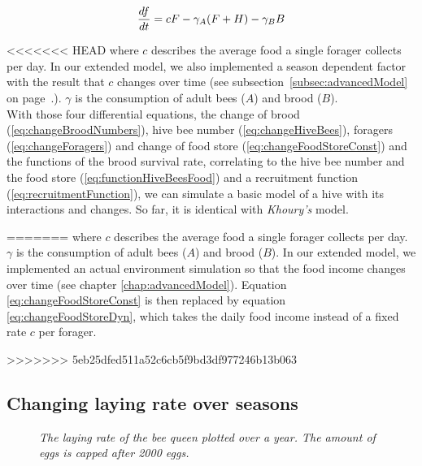 	\begin{equation}\label{eq:changeFoodStoreConst}
		{df \over dt} = c F - \gamma_A (F+H) - \gamma_B B
	\end{equation}
         
<<<<<<< HEAD
	where $c$ describes the average food a single forager collects per day. In our extended model, we also implemented a season dependent factor with the result that $c$ changes over time (see subsection~\ref{subsec:advancedModel} on page~\pageref{subsec:advancedModel}.). $\gamma$ is the consumption of adult bees ($A$) and brood ($B$).\\
	With those four differential equations, the change of brood (\ref{eq:changeBroodNumbers}), hive bee number (\ref{eq:changeHiveBees}), foragers (\ref{eq:changeForagers}) and change of food store (\ref{eq:changeFoodStoreConst}) and the functions of the brood survival rate, correlating to the hive bee number and the food store (\ref{eq:functionHiveBeesFood}) and a recruitment function (\ref{eq:recruitmentFunction}), we can simulate a basic model of a hive with its interactions and changes. So far, it is identical with \textit{Khoury's} model.
	
=======
	where $c$ describes the average food a single forager collects per day. $\gamma$ is the consumption of adult bees ($A$) and brood ($B$). In our extended model, we implemented an actual environment simulation so that the food income changes over time (see chapter \ref{chap:advancedModel}). Equation \ref{eq:changeFoodStoreConst} is then replaced by equation \ref{eq:changeFoodStoreDyn}, which takes the daily food income instead of a fixed rate $c$ per forager.

>>>>>>> 5eb25dfed511a52c6cb5f9bd3df977246b13b063
	\subsection{Changing laying rate over seasons}
		\begin{figure}
			\centering
			\caption{\textit{The laying rate of the bee queen plotted over a year. The amount of eggs is capped after 2000 eggs. }}
			\label{fig:dynLayingRate}
		\end{figure}
		
